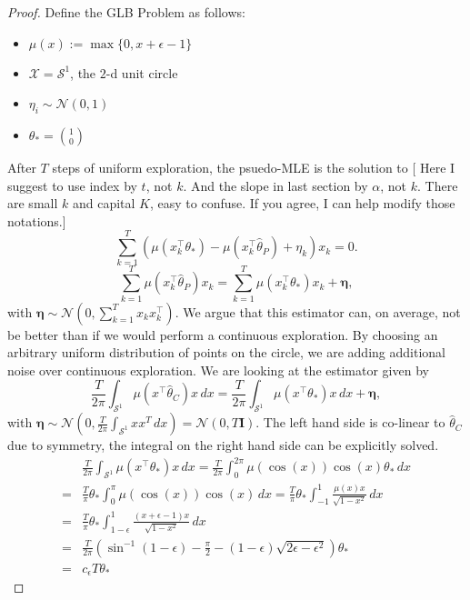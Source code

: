 \documentclass[twoside]{article} \usepackage{aistats2017}
\newcommand{\shuai}[1]{{\color{blue!50!black} [\text{Shuai:} #1]}}
\begin{document}
\begin{proof}
    
    Define the GLB Problem as follows:
    \begin{itemize}
    \item $\mu(x) := \max\{0, x+\epsilon-1\}$
    \item $\mathcal{X} = \mathcal{S}^1$, the $2$-d unit circle
    \item $\eta_i\sim \mathcal{N}(0,1)$
    \item $\theta_* = \binom{1}{0}
    $
    \end{itemize}
    After $T$ steps of uniform exploration, the psuedo-MLE is the solution to
    \shuai{Here I suggest to use index by $t$, not $k$. And the slope in last section by $\alpha$, not $k$. There are small $k$ and capital $K$, easy to confuse. If you agree, I can help modify those notations.}
    $$\sum_{k=1}^T\left(\mu(x_k^\top\theta_*)-\mu(x_k^\top\hat{\theta}_P)+\eta_k\right)x_k=0.$$
    $$\sum_{k=1}^T\mu(x_k^\top\hat{\theta}_P)x_k = \sum_{k=1}^T\mu(x_k^\top\theta_*)x_k + \boldsymbol{\eta},$$
    with $\boldsymbol{\eta}\sim \mathcal{N}\left(0,\sum_{k=1}^Tx_kx_k^\top\right)$.
    We argue that this estimator can, on average, not be better than if we would perform a continuous exploration.
    By choosing an arbitrary uniform distribution of points on the circle, we are adding additional noise over continuous exploration. We are looking at the estimator given by
    $$\frac{T}{2\pi}\int_{\mathcal{S}^1}\mu(x^\top\hat{\theta}_C)x\,dx = \frac{T}{2\pi}\int_{\mathcal{S}^1}\mu(x^\top\theta_*)x\,dx + \boldsymbol{\eta},$$
    with $\boldsymbol{\eta}\sim \mathcal{N}(0,\frac{T}{2\pi}\int_{\mathcal{S}^1}xx^T\,dx)=\mathcal{N}(0,T\mathbf{I})$.
    The left hand side is co-linear to $\hat{\theta}_C$ due to symmetry, the integral on the right hand side can be explicitly solved.
    \begin{align*}
    &\frac{T}{2\pi}\int_{\mathcal{S}^1}\mu(x^\top\theta_*)x\,dx = \frac{T}{2\pi}\int_{0}^{2\pi}\mu(\cos(x))\cos(x)\theta_*\,dx \\
    =&\frac{T}{\pi}\theta_*\int_{0}^{\pi}\mu(\cos(x))\cos(x)\,dx=\frac{T}{\pi}\theta_*\int_{-1}^{1}\frac{\mu(x)x}{\sqrt{1-x^2}}\,dx\\
    =&\frac{T}{\pi}\theta_*\int_{1-\epsilon}^{1}\frac{(x + \epsilon - 1)x}{\sqrt{1-x^2}}\,dx \\
    =&\frac{T}{2\pi}\left(\sin^{-1}(1-\epsilon)-\frac{\pi}{2} - (1 - \epsilon)\sqrt{2\epsilon-\epsilon^2}\right)\theta_*\\
    =&c_\epsilon T\theta_*
    \end{align*}
    

\end{proof}
\end{document}
